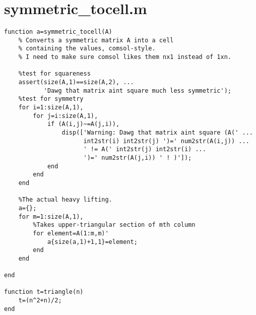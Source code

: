 \section{symmetric\_tocell.m}
\small
\begin{verbatim}
function a=symmetric_tocell(A)
    % Converts a symmetric matrix A into a cell 
    % containing the values, comsol-style.
    % I need to make sure comsol likes them nx1 instead of 1xn.

    %test for squareness
    assert(size(A,1)==size(A,2), ...
           'Dawg that matrix aint square much less symmetric');
    %test for symmetry
    for i=1:size(A,1),
        for j=i:size(A,1),
            if (A(i,j)~=A(j,i)),
                disp(['Warning: Dawg that matrix aint square (A(' ...
                      int2str(i) int2str(j) ')=' num2str(A(i,j)) ...
                      ' != A(' int2str(j) int2str(i) ...
                      ')=' num2str(A(j,i)) ' ! )']);
            end
        end
    end

    %The actual heavy lifting.
    a={};
    for m=1:size(A,1),
        %Takes upper-triangular section of mth column
        for element=A(1:m,m)'
            a{size(a,1)+1,1}=element;
        end
    end

end

function t=triangle(n)
    t=(n^2+n)/2;
end
\end{verbatim}
\normalsize

